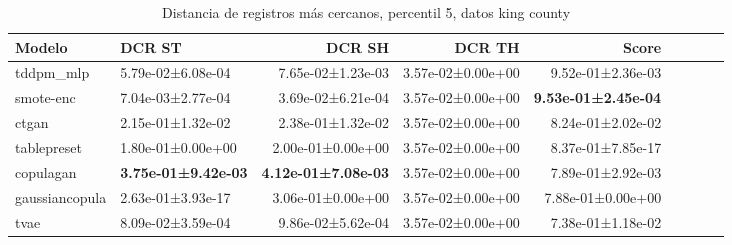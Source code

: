 \begin{table}[H]
\centering
\fontsize{10}{14}\selectfont
\caption{Distancia de registros más cercanos, percentil 5, datos king county}
\label{table-nndr-king county-a}
\begin{tabular}{|l|l|r|r|r|r|r|r|r|}
\hline
\rowcolor[gray]{0.8}
Modelo & DCR ST & DCR SH & DCR TH & \textbf{Score} \\
\hline tddpm\_mlp & 5.79e-02±6.08e-04 & 7.65e-02±1.23e-03 & 3.57e-02±0.00e+00 & 9.52e-01±2.36e-03 \\
\hline smote-enc & \cellcolor[rgb]{0.9, 0.54, 0.52} 7.04e-03±2.77e-04 & \cellcolor[rgb]{0.9, 0.54, 0.52} 3.69e-02±6.21e-04 & 3.57e-02±0.00e+00 & \bfseries 9.53e-01±2.45e-04 \\
\hline ctgan & 2.15e-01±1.32e-02 & 2.38e-01±1.32e-02 & 3.57e-02±0.00e+00 & 8.24e-01±2.02e-02 \\
\hline tablepreset & 1.80e-01±0.00e+00 & 2.00e-01±0.00e+00 & 3.57e-02±0.00e+00 & 8.37e-01±7.85e-17 \\
\hline copulagan & \bfseries 3.75e-01±9.42e-03 & \bfseries 4.12e-01±7.08e-03 & 3.57e-02±0.00e+00 & 7.89e-01±2.92e-03 \\
\hline gaussiancopula & 2.63e-01±3.93e-17 & 3.06e-01±0.00e+00 & 3.57e-02±0.00e+00 & 7.88e-01±0.00e+00 \\
\hline tvae & 8.09e-02±3.59e-04 & 9.86e-02±5.62e-04 & 3.57e-02±0.00e+00 & \cellcolor[rgb]{0.9, 0.54, 0.52} 7.38e-01±1.18e-02 \\
\hline
\end{tabular}
\end{table}

